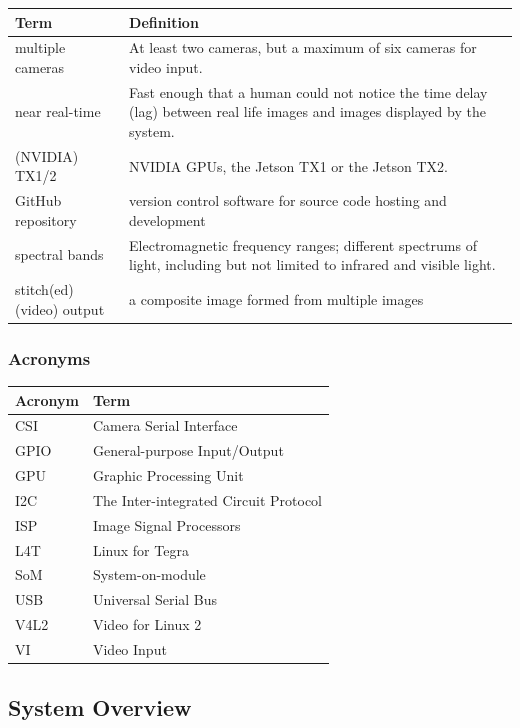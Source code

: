 \documentclass[letterpaper,10pt,serif,draftclsnofoot,onecolumn,compsoc,titlepage]{IEEEtran}
\begin{document}
\begin{tabular}{|l|p{11cm}|}
	\hline
	\textbf{Term} & \textbf{Definition}\\
	\hline
	multiple cameras & At least two cameras, but a maximum of six cameras for 
	video input.\\
	\hline
	near real-time & Fast enough that a human could not notice the time 
	delay (lag) between \newline real life images and images displayed by the system.\\
	\hline
	(NVIDIA) TX1/2 & NVIDIA GPUs, the Jetson TX1 or the Jetson TX2.\\
	\hline
	GitHub repository & version control software for source code hosting and development\\
	\hline
	spectral bands & Electromagnetic frequency ranges; different 
	spectrums of light, including \newline but not limited to infrared 
	and visible light.\\
	\hline
	stitch(ed) (video) output & a composite image formed from multiple images\\
	\hline
\end{tabular}

\subsubsection{Acronyms}

\begin{tabular}{|l|l|}
	\hline
	\textbf{Acronym} & \textbf{Term}\\
	\hline
	CSI & Camera Serial Interface\\
	\hline
	GPIO & General-purpose Input/Output\\
	\hline
	GPU & Graphic Processing Unit\\
	\hline
	I2C & The Inter-integrated Circuit Protocol\\
	\hline
	ISP & Image Signal Processors\\
	\hline
	L4T & Linux for Tegra \\
	\hline
	SoM & System-on-module\\
	\hline
	USB & Universal Serial Bus\\
	\hline
	V4L2 & Video for Linux 2 \\
	\hline
	VI & Video Input\\
	\hline
\end{tabular}

\newpage
\subsection{System Overview}  
\end{document}
